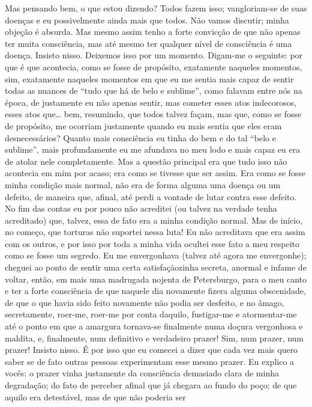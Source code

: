 Mas pensando bem, o que estou dizendo? Todos fazem isso; vangloriam-se
de suas doenças e eu possivelmente ainda mais que todos. Não vamos
discutir; minha objeção é absurda. Mas mesmo assim tenho a forte
convicção de que não apenas ter muita consciência, mas até mesmo ter
qualquer nível de consciência é uma doença. Insisto nisso. Deixemos
isso por um momento. Digam-me o seguinte: por que é que acontecia, como
se fosse de propósito, exatamente naqueles momentos, sim, exatamente
naqueles momentos em que eu me sentia mais capaz de sentir todas as
nuances de “tudo que há de belo e sublime”, como falavam entre nós na
época, de justamente eu não apenas sentir, mas cometer esses atos
indecorosos, esses atos que\ldots{} bem, resumindo, que todos talvez façam,
mas que, como se fosse de propósito, me ocorriam justamente quando eu
mais sentia que eles eram desnecessários? Quanto mais consciência eu
tinha do bem e do tal “belo e sublime”, mais profundamente eu me
afundava no meu lodo e mais capaz eu era de atolar nele completamente.
Mas a questão principal era que tudo isso não acontecia em mim por
acaso; era como se tivesse que ser assim. Era como se fosse minha
condição mais normal, não era de forma alguma uma doença ou um defeito,
de maneira que, afinal, até perdi a vontade de lutar contra esse
defeito. No fim das contas eu por pouco não acreditei (ou talvez na
verdade tenha acreditado) que, talvez, essa de fato era a minha
condição normal. Mas de início, no começo, que torturas não suportei
nessa luta! Eu não acreditava que era assim com os outros, e por isso
por toda a minha vida ocultei esse fato a meu respeito como se fosse um
segredo. Eu me envergonhava (talvez até agora me envergonhe); cheguei
ao ponto de sentir uma certa satisfaçãozinha secreta, anormal e infame
de voltar, então, em mais uma madrugada nojenta de Petersburgo, para o
meu canto e ter a forte consciência de que naquele dia novamente fizera
alguma obscenidade, de que o que havia sido feito novamente não podia
ser desfeito, e no âmago, secretamente, roer-me, roer-me por conta
daquilo, fustigar-me e atormentar-me até o ponto em que a amargura
tornava-se finalmente numa doçura vergonhosa e maldita, e, finalmente,
num definitivo e verdadeiro prazer! Sim, num prazer, num prazer!
Insisto nisso. É por isso que eu comecei a dizer que cada vez mais
quero saber se de fato outras pessoas experimentam esse mesmo prazer.
Eu explico a vocês: o prazer vinha justamente da consciência demasiado
clara de minha degradação; do fato de perceber afinal que já chegara ao
fundo do poço; de que aquilo era detestável, mas de que não poderia ser
